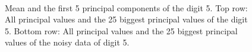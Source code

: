 \documentclass[a4paper, 12pt, titlepage]{article}
\begin{document}
\begin{figure}[H]
	\centering
	\\
	\caption{\protect{} Mean and the first 5 principal components of the digit 5. \protect{} Top row: All principal values and the 25 biggest principal values of the digit 5. Bottom row: All principal values and the 25 biggest principal values of the noisy data of digit 5.}
\end{figure}
\end{document}
